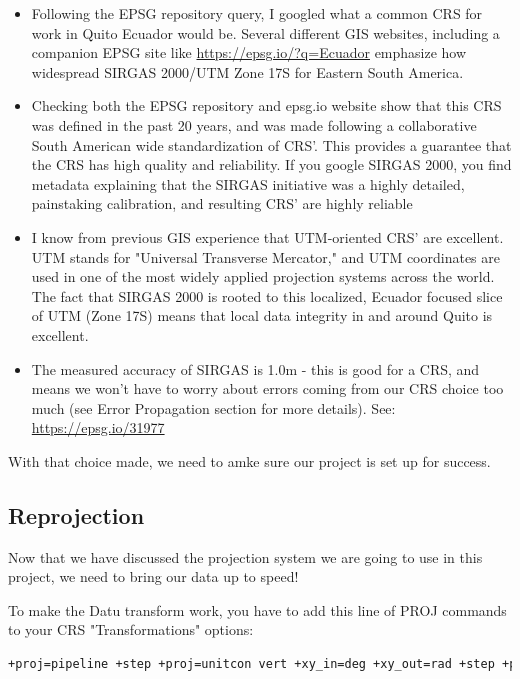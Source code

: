 \documentclass{article}
\begin{document}
\begin{itemize}
    \item Following the EPSG repository query, I googled what a common CRS for work in Quito Ecuador would be. Several different GIS websites, including a companion EPSG site like \url{https://epsg.io/?q=Ecuador} emphasize how widespread SIRGAS 2000/UTM Zone 17S for Eastern South America. 
    \item Checking both the EPSG repository and epsg.io website show that this CRS was defined in the past 20 years, and was made following a collaborative South American wide standardization of CRS'. This provides a guarantee that the CRS has high quality and reliability. If you google SIRGAS 2000, you find metadata explaining that the SIRGAS initiative was a highly detailed, painstaking calibration, and resulting CRS' are highly reliable
    \item I know from previous GIS experience that UTM-oriented CRS' are excellent. UTM stands for "Universal Transverse Mercator," and UTM coordinates are used in one of the most widely applied projection systems across the world. The fact that SIRGAS 2000 is rooted to this localized, Ecuador focused slice of UTM (Zone 17S) means that local data integrity in and around Quito is excellent. 
    \item The measured accuracy of SIRGAS is 1.0m - this is good for a CRS, and means we won't have to worry about errors coming from our CRS choice too much (see Error Propagation section for more details). See: \url{https://epsg.io/31977}
\end{itemize}

With that choice made, we need to amke sure our project is set up for success. 

\subsection{Reprojection}

Now that we have discussed the projection system we are going to use in this project, we need to bring our data up to speed!

To make the Datu transform work, you have to add this line of PROJ commands to your CRS "Transformations" options: 

\begin{lstlisting}[language=bash]
    +proj=pipeline +step +proj=unitcon vert +xy_in=deg +xy_out=rad +step +proj=utm +zone=17 +south +ellps=GRS80
\end{lstlisting}
\end{document}
